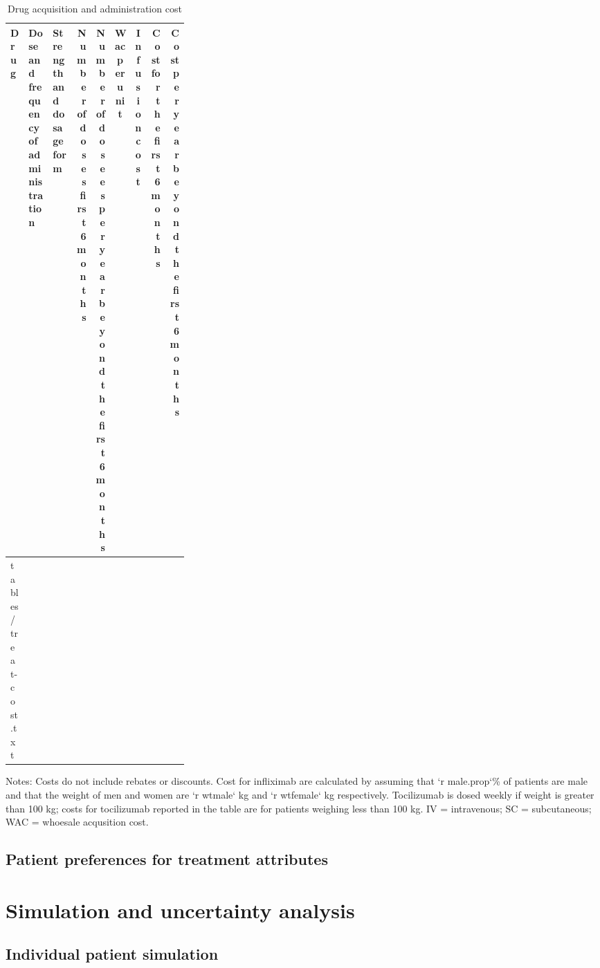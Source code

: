 \documentclass[11pt,final,fleqn]{article}\usepackage[]{graphicx}\usepackage[]{color}
\makeatletter
\theoremstyle{plain}
\newcommand*\ExpandableInput[1]{\@@input#1 }
\makeatother
\begin{document}
\begin{landscape}
\begin{table}[!ht]
\begin{center}
\begin{threeparttable}
\caption{Drug acquisition and administration cost} \label{tbl:treat-cost}
\scriptsize
\begin{tabular}{lp{0.15\linewidth}p{0.15\linewidth}rrrrrr}
\hline
\multicolumn{1}{l}{Drug} &
\multicolumn{1}{p{0.15\linewidth}}{Dose and frequency of administration} & 
\multicolumn{1}{p{0.15\linewidth}}{Strength and dosage form} & 
\multicolumn{1}{p{0.08\linewidth}}{Number of doses first 6 months}  & 
\multicolumn{1}{p{0.08\linewidth}}{Number of dosees per year beyond the first 6 months} & 
\multicolumn{1}{c}{Wac per unit} & \multicolumn{1}{c}{Infusion cost} & 
\multicolumn{1}{p{0.08\linewidth}}{Cost for the first 6 months} &
\multicolumn{1}{p{0.08\linewidth}}{Cost per year beyond the first 6 months}\\
\hline
\ExpandableInput{tables/treat-cost.txt}
\hline
\end{tabular}
\tiny
Notes: Costs do not include rebates or discounts. Cost for infliximab are calculated by assuming that `r male.prop`\% of patients are male and that the weight of men and women are `r wtmale` kg and `r wtfemale` kg respectively. Tocilizumab is dosed weekly if weight is greater than 100 kg; costs for tocilizumab reported in the table are for patients weighing less than 100 kg. IV = intravenous; SC = subcutaneous; WAC = whoesale acqusition cost. 
\end{threeparttable}
\end{center}
\end{table}
\end{landscape}

\subsection{Patient preferences for treatment
attributes}\label{patient-preferences-for-treatment-attributes}

\section{Simulation and uncertainty analysis}\label{sec:sim-uncertainty}

\subsection{Individual patient simulation}\label{individual-patient-simulation}
\end{document}
